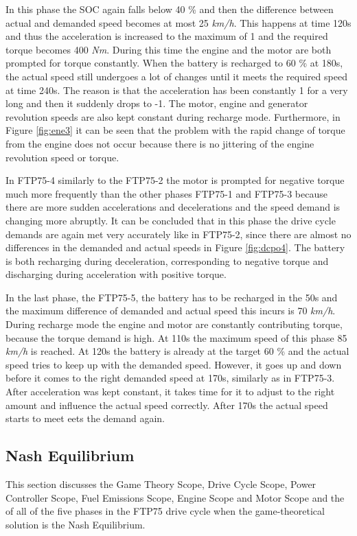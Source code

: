In this phase the SOC again falls below 40 \% and then the difference between actual and demanded speed becomes at most 25 \textit{km/h}. This happens at time 120s and thus the acceleration is increased to the maximum of 1 and the required torque becomes 400 \textit{Nm}. During this time the engine and the motor are both prompted for torque constantly. When the battery is recharged to 60 \% at 180s, the actual speed still undergoes a lot of changes until it meets the required speed at time 240s. The reason is that the acceleration has been constantly 1 for a very long and then it suddenly drops to -1. The motor, engine and generator revolution speeds are also kept constant during recharge mode. Furthermore, in Figure \ref{fig:ene3} it can be seen that the problem with the rapid change of torque from the engine does not occur because there is no jittering of the engine revolution speed or torque.

In FTP75-4 similarly to the FTP75-2 the motor is prompted for negative torque much more frequently than the other phases FTP75-1 and FTP75-3 because there are more sudden accelerations and decelerations and the speed demand is changing more abruptly. It can be concluded that in this phase the drive cycle demands are again met very accurately like in FTP75-2, since there are almost no differences in the demanded and actual speeds in Figure \ref{fig:dcpo4}. The battery is both recharging during deceleration, corresponding to negative torque and discharging during acceleration with positive torque.

In the last phase, the FTP75-5, the battery has to be recharged in the 50s and the maximum difference of demanded and actual speed this incurs is 70 \textit{km/h}. During recharge mode the engine and motor are constantly contributing torque, because the torque demand is high. At 110s the maximum speed of this phase 85 \textit{km/h} is reached. At 120s the battery is already at the target 60 \% and the actual speed tries to keep up with the demanded speed. However, it goes up and down before it comes to the right demanded speed at 170s, similarly as in FTP75-3. After acceleration was kept constant, it takes time for it to adjust to the right amount and influence the actual speed correctly. After 170s the actual speed starts to meet eets the demand again. 

\subsection{Nash Equilibrium}
This section discusses the Game Theory Scope, Drive Cycle Scope, Power Controller Scope, Fuel Emissions Scope, Engine Scope and Motor Scope and the of all of the five phases in the FTP75 drive cycle when the game-theoretical solution is the Nash Equilibrium.

